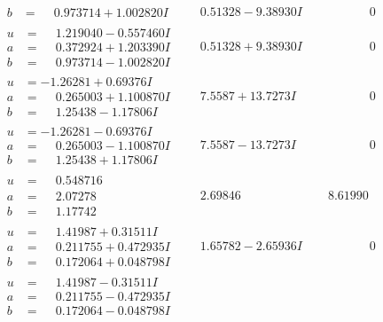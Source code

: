 \documentclass[1p]{elsarticle_modified}
\theoremstyle{definition}
\begin{document}
$$\begin{array}{c|c|c}
\begin{aligned}
b &= \phantom{-}0.973714 + 1.002820 I\end{aligned}
 & \phantom{-}0.51328 - 9.38930 I & \phantom{-0.000000 } 0 \\ \hline\begin{aligned}
u &= \phantom{-}1.219040 - 0.557460 I \\
a &= \phantom{-}0.372924 + 1.203390 I \\
b &= \phantom{-}0.973714 - 1.002820 I\end{aligned}
 & \phantom{-}0.51328 + 9.38930 I & \phantom{-0.000000 } 0 \\ \hline\begin{aligned}
u &= -1.26281 + 0.69376 I \\
a &= \phantom{-}0.265003 + 1.100870 I \\
b &= \phantom{-}1.25438 - 1.17806 I\end{aligned}
 & \phantom{-}7.5587 + 13.7273 I & \phantom{-0.000000 } 0 \\ \hline\begin{aligned}
u &= -1.26281 - 0.69376 I \\
a &= \phantom{-}0.265003 - 1.100870 I \\
b &= \phantom{-}1.25438 + 1.17806 I\end{aligned}
 & \phantom{-}7.5587 - 13.7273 I & \phantom{-0.000000 } 0 \\ \hline\begin{aligned}
u &= \phantom{-}0.548716\phantom{ +0.000000I} \\
a &= \phantom{-}2.07278\phantom{ +0.000000I} \\
b &= \phantom{-}1.17742\phantom{ +0.000000I}\end{aligned}
 & \phantom{-}2.69846\phantom{ +0.000000I} & \phantom{-}8.61990\phantom{ +0.000000I} \\ \hline\begin{aligned}
u &= \phantom{-}1.41987 + 0.31511 I \\
a &= \phantom{-}0.211755 + 0.472935 I \\
b &= \phantom{-}0.172064 + 0.048798 I\end{aligned}
 & \phantom{-}1.65782 - 2.65936 I & \phantom{-0.000000 } 0 \\ \hline\begin{aligned}
u &= \phantom{-}1.41987 - 0.31511 I \\
a &= \phantom{-}0.211755 - 0.472935 I \\
b &= \phantom{-}0.172064 - 0.048798 I\end{aligned}

\end{array}$$
\end{document}
